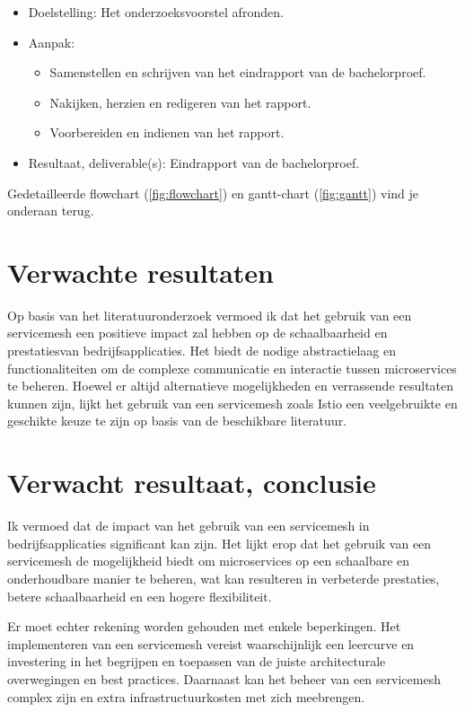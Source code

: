 \begin{itemize}
\begin{itemize}
		\item Doelstelling: Het onderzoeksvoorstel afronden.
		\item Aanpak:
		\begin{itemize} 
			\item Samenstellen en schrijven van het eindrapport van de bachelorproef.
			\item Nakijken, herzien en redigeren van het rapport.
			\item Voorbereiden en indienen van het rapport.
		\end{itemize}     
		\item Resultaat, deliverable(s): Eindrapport van de bachelorproef.  
	\end{itemize}
\end{itemize}

Gedetailleerde flowchart (\ref{fig:flowchart}) en gantt-chart (\ref{fig:gantt}) vind je onderaan terug.


\section{Verwachte resultaten}%
\label{sec:verwachte-resultaten}

Op basis van het literatuuronderzoek vermoed ik dat het gebruik van een servicemesh een positieve impact zal hebben op de schaalbaarheid en prestatiesvan bedrijfsapplicaties. Het biedt de nodige abstractielaag en functionaliteiten om de complexe communicatie en interactie tussen microservices te beheren. Hoewel er altijd alternatieve mogelijkheden en verrassende resultaten kunnen zijn, lijkt het gebruik van een servicemesh zoals Istio een veelgebruikte en geschikte keuze te zijn op basis van de beschikbare literatuur.

\section{Verwacht resultaat, conclusie}%
\label{sec:verwachte_resultaten}

Ik vermoed dat de impact van het gebruik van een servicemesh in bedrijfsapplicaties significant kan zijn. Het lijkt erop dat het gebruik van een servicemesh de mogelijkheid biedt om microservices op een schaalbare en onderhoudbare manier te beheren, wat kan resulteren in verbeterde prestaties, betere schaalbaarheid en een hogere flexibiliteit.

Er moet echter rekening worden gehouden met enkele beperkingen. Het implementeren van een servicemesh vereist waarschijnlijk een leercurve en investering in het begrijpen en toepassen van de juiste architecturale overwegingen en best practices. Daarnaast kan het beheer van een servicemesh complex zijn en extra infrastructuurkosten met zich meebrengen.

